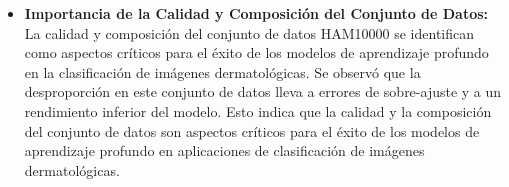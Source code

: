 \begin{conclusions}
\begin{itemize}
    \item \textbf{Importancia de la Calidad y Composición del Conjunto de Datos:} La calidad y composición del conjunto de datos HAM10000 se identifican como aspectos críticos para el éxito de los modelos de aprendizaje profundo en la clasificación de imágenes dermatológicas. Se observó que la desproporción en este conjunto de datos lleva a errores de sobre-ajuste y a un rendimiento inferior del modelo. Esto indica que la calidad y la composición del conjunto de datos son aspectos críticos para el éxito de los modelos de aprendizaje profundo en aplicaciones de clasificación de imágenes dermatológicas.
\end{itemize}

\end{conclusions}
